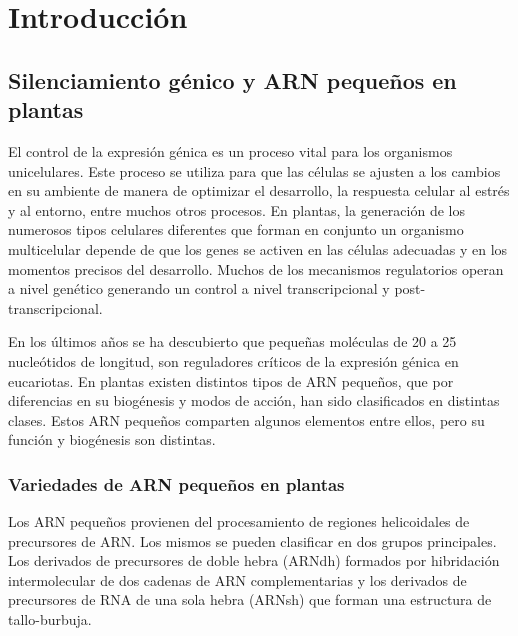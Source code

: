 \graphicspath{{Introduccion/Figs/}}


\chapter{Introducción} 

\section{Silenciamiento génico y ARN pequeños en plantas}
El control de la expresión génica es un proceso vital para los organismos unicelulares.
Este proceso se utiliza para que las células se ajusten a los cambios en su ambiente de manera de optimizar el desarrollo, la respuesta celular al estrés y al entorno, entre muchos otros procesos.
En plantas, la generación de los numerosos tipos celulares diferentes que forman en conjunto un organismo multicelular depende de que los genes se activen en las células adecuadas y en los momentos precisos del desarrollo.
Muchos de los mecanismos regulatorios operan a nivel genético generando un control a nivel transcripcional y post-transcripcional.

En los últimos años se ha descubierto que pequeñas moléculas de 20 a 25 nucleótidos de longitud, son reguladores críticos de la expresión génica en eucariotas.
En plantas existen distintos tipos de ARN pequeños, que por diferencias en su biogénesis y modos de acción, han sido clasificados en distintas clases.
Estos ARN pequeños comparten algunos elementos entre ellos, pero su función y biogénesis son distintas. 

\subsection{Variedades de ARN pequeños en plantas}
Los ARN pequeños provienen del procesamiento de regiones helicoidales de precursores de ARN.
Los mismos se pueden clasificar en dos grupos principales. 
Los derivados de precursores de doble hebra (ARNdh) formados por hibridación intermolecular de dos cadenas de ARN complementarias y los derivados de precursores de RNA de una sola hebra (ARNsh) que forman una estructura de tallo-burbuja.

